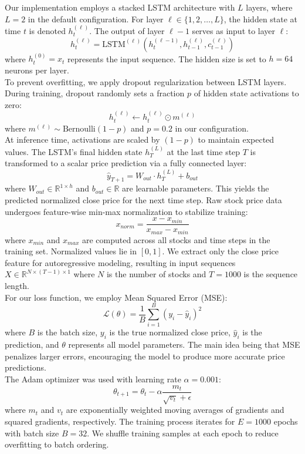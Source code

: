 \documentclass[sigconf]{acmart}
\begin{document}
Our implementation employs a stacked LSTM architecture with $L$ layers, where $L=2$ in the default configuration. For layer $\ell \in \{1, 2, \ldots, L\}$, the hidden state at time $t$ is denoted $h_t^{(\ell)}$. The output of layer $\ell-1$ serves as input to layer $\ell$:
$$h_t^{(\ell)} = \text{LSTM}^{(\ell)}(h_t^{(\ell-1)}, h_{t-1}^{(\ell)}, c_{t-1}^{(\ell)})$$
where $h_t^{(0)} = x_t$ represents the input sequence. The hidden size is set to $h=64$ neurons per layer.\\

To prevent overfitting, we apply dropout regularization between LSTM layers. During training, dropout randomly sets a fraction $p$ of hidden state activations to zero:
$$h_t^{(\ell)} \leftarrow h_t^{(\ell)} \odot m^{(\ell)}$$
where $m^{(\ell)} \sim \text{Bernoulli}(1-p)$ and $p=0.2$ in our configuration. \\

At inference time, activations are scaled by $(1-p)$ to maintain expected values. The LSTM's final hidden state $h_T^{(L)}$ at the last time step $T$ is transformed to a scalar price prediction via a fully connected layer:
$$\hat{y}_{T+1} = W_{out} \cdot h_T^{(L)} + b_{out}$$
where $W_{out} \in \mathbb{R}^{1 \times h}$ and $b_{out} \in \mathbb{R}$ are learnable parameters. This yields the predicted normalized close price for the next time step. Raw stock price data undergoes feature-wise min-max normalization to stabilize training:
$$x_{norm} = \frac{x - x_{min}}{x_{max} - x_{min}}$$
where $x_{min}$ and $x_{max}$ are computed across all stocks and time steps in the training set. Normalized values lie in $[0, 1]$. We extract only the close price feature for autoregressive modeling, resulting in input sequences $X \in \mathbb{R}^{N \times (T-1) \times 1}$ where $N$ is the number of stocks and $T=1000$ is the sequence length. \\

For our loss function, we employ Mean Squared Error (MSE):
$$\mathcal{L}(\theta) = \frac{1}{B} \sum_{i=1}^{B} (y_i - \hat{y}_i)^2$$
where $B$ is the batch size, $y_i$ is the true normalized close price, $\hat{y}_i$ is the prediction, and $\theta$ represents all model parameters. The main idea being that MSE penalizes larger errors, encouraging the model to produce more accurate price predictions. \\

The Adam optimizer was used with learning rate $\alpha = 0.001$:
$$\theta_{t+1} = \theta_t - \alpha \frac{m_t}{\sqrt{v_t} + \epsilon}$$
where $m_t$ and $v_t$ are exponentially weighted moving averages of gradients and squared gradients, respectively. The training process iterates for $E=1000$ epochs with batch size $B=32$. We shuffle training samples at each epoch to reduce overfitting to batch ordering.\\
\end{document}
